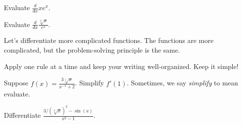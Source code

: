 \documentclass[../main.tex]{subfiles}
\begin{document}
  \begin{example}
    Evaluate \(\frac{d}{dx} x e^{x}\).

  \end{example}

  \begin{example}
    Evaluate \(\frac{d}{dx} \frac{\sqrt[3]{x}}{e^{x}}\).

  \end{example}
  \clearpage

  Let's differentiate more complicated functions. The functions are more complicated, but the problem-solving principle is the same. 
  \begin{mdframed}[style=simple]
    \color{main}
    \centering
    Apply one rule at a time and keep your writing well-organized. Keep it simple! 
  \end{mdframed}

  \begin{example}
    Suppose \(f(x) = \frac{3 \sqrt[5]{x}}{x^{-1} + 2}\). Simplify \(f'(1)\). 
    \hfill{}
    {\scriptsize Sometimes, we say \emph{simplify} to mean evaluate.}

  \end{example}


  \begin{example}
    Differentiate \(\frac{3/(\sqrt[3]{x})^{2} - \sin(x)}{x^{2} - 1}\).

  \end{example}
  \clearpage
\end{document}
